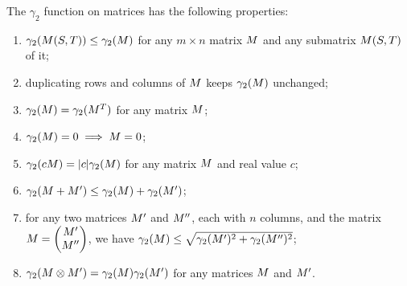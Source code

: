 \begin{lemma}\label{lm:ch7-gamma2-props}
  The $\gamma_2$ function on matrices has the following properties:
  \begin{enumerate}
  \item $\gamma_2(M(S,T)) \le \gamma_2(M)$ for any $m\times n$
    matrix $M$ and any submatrix $M(S,T)$ of
    it;\label{pr:ch7-submatrix}
  \item duplicating rows and columns of $M$  keeps $\gamma_2(M)$ unchanged;\label{pr:ch7-duplicate}
  \item $\gamma_2(M) = \gamma_2(M^T)$ for any matrix $M$;\label{pr:ch7-transpose}
  \item $\gamma_2(M) = 0 \implies M = 0$;\label{pr:ch7-pos}
  \item $\gamma_2(cM) = |c|\gamma_2(M)$ for any matrix $M$
    and real value $c$;\label{pr:ch7-hom}
  \item $\gamma_2(M + M') \le \gamma_2(M) + \gamma_2(M')$;\label{pr:ch7-triangle}
  \item for any two matrices $M'$ and $M''$, each with $n$ columns, and the matrix 
    $M = \begin{pmatrix}M'\\ M''\end{pmatrix}$, 
    we have $\gamma_2(M) \le \sqrt{\gamma_2(M')^2 +
      \gamma_2(M'')^2}$; \label{pr:ch7-union}
  \item $\gamma_2(M \otimes M') = \gamma_2(M)
    \gamma_2(M')$ for any matrices $M$ and $M'$.\label{pr:ch7-tensor}
  \end{enumerate}
\end{lemma}
